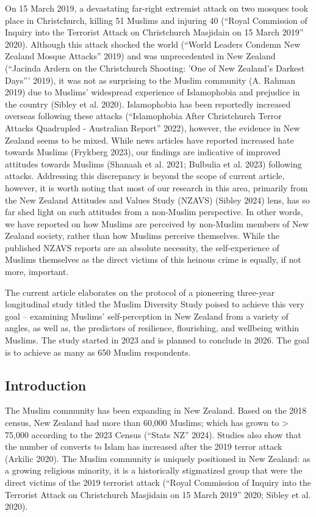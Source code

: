 \documentclass[
]{interact}
\begin{document}
On 15 March 2019, a devastating far-right extremist attack on two
mosques took place in Christchurch, killing 51 Muslims and injuring 40
({``Royal {C}ommission of {I}nquiry into the Terrorist Attack on
{C}hristchurch {M}asjidain on 15 {M}arch 2019''} 2020). Although this
attack shocked the world ({``World Leaders Condemn New Zealand Mosque
Attacks''} 2019) and was unprecedented in New Zealand ({``Jacinda
{A}rdern on the {C}hristchurch Shooting: 'One of {N}ew {Z}ealand's
Darkest Days'''} 2019), it was not as surprising to the Muslim community
(A. Rahman 2019) due to Muslims' widespread experience of Islamophobia
and prejudice in the country (Sibley et al. 2020). Islamophobia has been
reportedly increased overseas following these attacks ({``Islamophobia
After {C}hristchurch Terror Attacks Quadrupled - {A}ustralian Report''}
2022), however, the evidence in New Zealand seems to be mixed. While
news articles have reported increased hate towards Muslims (Frykberg
2023), our findings are indicative of improved attitudes towards Muslims
(Shanaah et al. 2021; Bulbulia et al. 2023) following attacks.
Addressing this discrepancy is beyond the scope of current article,
however, it is worth noting that most of our research in this area,
primarily from the New Zealand Attitudes and Values Study (NZAVS)
(Sibley 2024) lens, has so far shed light on such attitudes from a
non-Muslim perspective. In other words, we have reported on how Muslims
are perceived by non-Muslim members of New Zealand society, rather than
how Muslims perceive themselves. While the published NZAVS reports are
an absolute necessity, the self-experience of Muslims themselves as the
direct victims of this heinous crime is equally, if not more, important.

The current article elaborates on the protocol of a pioneering
three-year longitudinal study titled the Muslim Diversity Study poised
to achieve this very goal -- examining Muslims' self-perception in New
Zealand from a variety of angles, as well as, the predictors of
resilience, flourishing, and wellbeing within Muslims. The study started
in 2023 and is planned to conclude in 2026. The goal is to achieve as
many as 650 Muslim respondents.

\subsection{Introduction}\label{introduction}

The Muslim community has been expanding in New Zealand. Based on the
2018 census, New Zealand had more than 60,000 Muslims; which has grown
to \textgreater{} 75,000 according to the 2023 Census ({``Stats NZ''}
2024). Studies also show that the number of converts to Islam has
increased after the 2019 terror attack (Arkilic 2020). The Muslim
community is uniquely positioned in New Zealand: as a growing religious
minority, it is a historically stigmatized group that were the direct
victims of the 2019 terrorist attack ({``Royal {C}ommission of {I}nquiry
into the Terrorist Attack on {C}hristchurch {M}asjidain on 15 {M}arch
2019''} 2020; Sibley et al. 2020).
\end{document}
